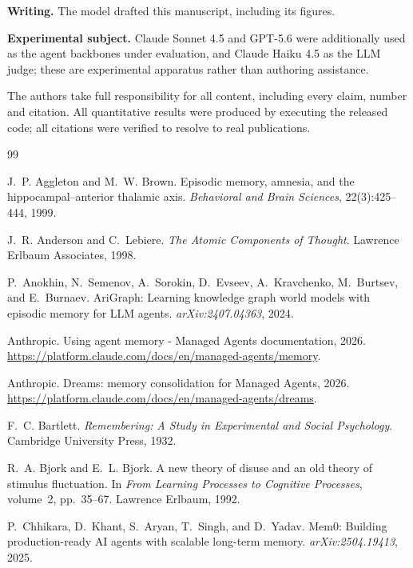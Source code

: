 \documentclass{article}
\theoremstyle{definition}\newtheorem{remark}{Remark}
\theoremstyle{plain}\newtheorem{proposition}{Proposition}
\begin{document}
\textbf{Writing.} The model drafted this manuscript, including its figures.

\textbf{Experimental subject.} Claude Sonnet 4.5 and GPT-5.6 were additionally
used as the agent backbones under evaluation, and Claude Haiku 4.5 as the
LLM judge; these are experimental apparatus rather than authoring assistance.

The authors take full responsibility for all content, including every claim,
number and citation. All quantitative results were produced by executing the
released code; all citations were verified to resolve to real publications.

\begin{thebibliography}{99}\small

 J.~P. Aggleton and M.~W. Brown.
Episodic memory, amnesia, and the hippocampal--anterior thalamic axis.
\emph{Behavioral and Brain Sciences}, 22(3):425--444, 1999.

 J.~R. Anderson and
C.~Lebiere. \emph{The Atomic Components of Thought}. Lawrence Erlbaum
Associates, 1998.

 P.~Anokhin, N.~Semenov,
A.~Sorokin, D.~Evseev, A.~Kravchenko, M.~Burtsev, and E.~Burnaev. AriGraph:
Learning knowledge graph world models with episodic memory for LLM agents.
\emph{arXiv:2407.04363}, 2024.

 Anthropic. Using agent memory
- Managed Agents documentation, 2026.
\url{https://platform.claude.com/docs/en/managed-agents/memory}.

 Anthropic. Dreams: memory
consolidation for Managed Agents, 2026.
\url{https://platform.claude.com/docs/en/managed-agents/dreams}.

 F.~C. Bartlett. \emph{Remembering: A
Study in Experimental and Social Psychology}. Cambridge University Press, 1932.

 R.~A. Bjork and E.~L. Bjork. A new
theory of disuse and an old theory of stimulus fluctuation. In \emph{From
Learning Processes to Cognitive Processes}, volume~2, pp.\ 35--67. Lawrence
Erlbaum, 1992.

 P.~Chhikara, D.~Khant,
S.~Aryan, T.~Singh, and D.~Yadav. Mem0: Building production-ready AI agents
with scalable long-term memory. \emph{arXiv:2504.19413}, 2025.


\end{thebibliography}
\end{document}
